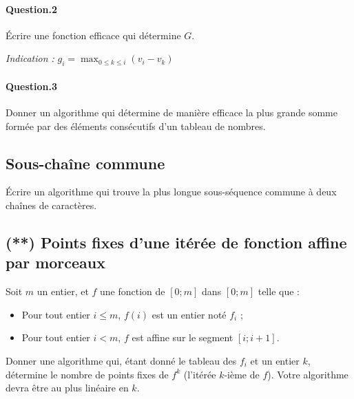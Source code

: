 \documentclass[10pt,a4paper]{article}
\begin{document}
\paragraph{Question.2} Écrire une fonction efficace qui détermine $G$.

\textit{Indication :} $g_i = \max_{0\leq k \leq i} (v_i - v_k)$
\paragraph{Question.3} Donner un algorithme qui détermine de manière efficace la plus grande somme formée par des éléments consécutifs d'un tableau de nombres.

\subsection{Sous-chaîne commune}
Écrire un algorithme qui trouve la plus longue sous-séquence commune 
à deux chaînes de caractères.

\subsection{(**) Points fixes d'une itérée de fonction affine par morceaux}
Soit $m$ un entier, et $f$ une fonction de $[0;m]$ dans $[0;m]$ telle que :
\begin{itemize}
\item Pour tout entier $i\leq m$, $f(i)$ est un entier noté $f_i$ ;
\item Pour tout entier $i<m$, $f$ est affine sur le segment $[i;i+1]$.
\end{itemize}
Donner une algorithme qui, étant donné le tableau des $f_i$ et un entier $k$, détermine le nombre de points fixes de $f^k$ (l'itérée $k$-ième de $f$). Votre algorithme devra être au plus linéaire en $k$.
\end{document}
